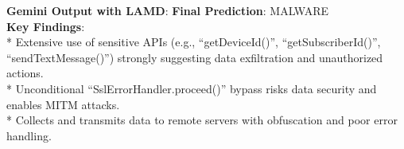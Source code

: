 \begin{tcolorbox}[fontupper=\small, fontlower=\small, 
left=2pt, %
right=2pt, %
top=3pt, %
bottom=3pt, %
before upper=\raggedright, 
after upper={\vspace{-4pt}},
before lower=\raggedright]
\textbf{Gemini Output with LAMD}:
\tcblower
\textbf{Final Prediction}: MALWARE \\
\textbf{Key Findings}: \\
* Extensive use of sensitive APIs (e.g., ``getDeviceId()'', ``getSubscriberId()'', ``sendTextMessage()'') strongly suggesting data exfiltration and unauthorized actions. \\
* Unconditional ``SslErrorHandler.proceed()'' bypass risks data security and enables MITM attacks. \\
* Collects and transmits data to remote servers with obfuscation and poor error handling.\\
\end{tcolorbox}












